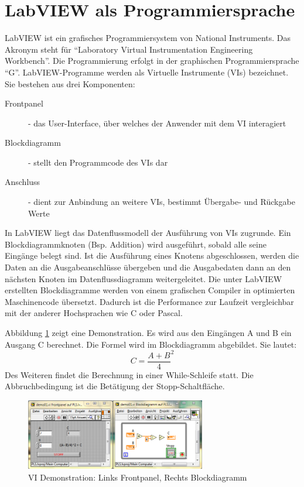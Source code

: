 \section{LabVIEW als Programmiersprache}
	\label{sec:labview}
	
LabVIEW ist ein grafisches Programmiersystem von National Instruments. Das Akronym steht für "`Laboratory Virtual Instrumentation Engineering Workbench"'.
Die Programmierung erfolgt in der graphischen Programmiersprache "`G"'.  LabVIEW-Programme werden als Virtuelle Instrumente (VIs) bezeichnet. \cite{ni-tuto} %
Sie bestehen aus drei Komponenten: 
\begin{description}
	\item[Frontpanel] - das User-Interface, über welches der Anwender mit dem VI interagiert
	\item[Blockdiagramm] - stellt den Programmcode des VIs dar
	\item[Anschluss] - dient zur Anbindung an weitere VIs, bestimmt Übergabe- und Rückgabe Werte
\end{description}

In LabVIEW liegt das Datenflussmodell der Ausführung von VIs  zugrunde. Ein Blockdiagrammknoten (Bsp. Addition) wird ausgeführt, sobald alle seine Eingänge belegt sind. 
Ist die Ausführung eines Knotens abgeschlossen, werden die Daten an die Ausgabeanschlüsse übergeben und die Ausgabedaten dann an den nächsten Knoten 
im Datenflussdiagramm weitergeleitet. \cite{labview-buch01}
Die unter LabVIEW erstellten Blockdiagramme werden von einem grafischen Compiler in optimierten Maschinencode übersetzt. 
Dadurch ist die Performance zur Laufzeit vergleichbar mit der anderer Hochsprachen wie C oder Pascal. \cite{ni-compiler}

Abbildung \ref{fig:demo01} zeigt eine  Demonstration. Es wird aus den Eingängen A und B ein Ausgang C berechnet. Die Formel wird im Blockdiagramm abgebildet. Sie lautet:
\[ C = \frac{A+B}{4}^{2} \]
Des Weiteren findet die Berechnung in einer While-Schleife statt. Die Abbruchbedingung ist die Betätigung der Stopp-Schaltfläche. 

	\begin{figure}%
	\centering
		\includegraphics[width=0.7\textwidth]{Pics/demo01.png}
	\caption{VI Demonstration: Links Frontpanel, Rechts Blockdiagramm}
	\label{fig:demo01}
	\end{figure}

